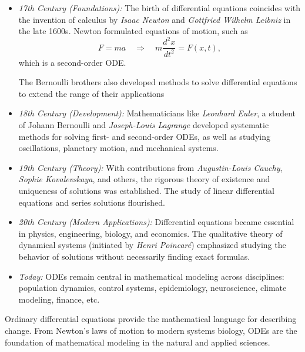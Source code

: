 \begin{itemize}
    \item \emph{17th Century (Foundations):}  
    The birth of differential equations coincides with the invention of calculus by \emph{Isaac Newton} and \emph{Gottfried Wilhelm Leibniz} in the late 1600s.  
    Newton formulated equations of motion, such as
    \[
    F = ma \quad \Rightarrow \quad m \frac{d^2x}{dt^2} = F(x,t),
    \]
    which is a second-order ODE.

    The Bernoulli brothers also developed methods to solve differential equations to extend the range of their applications

    \item \emph{18th Century (Development):}  
    Mathematicians like \emph{Leonhard Euler}, a student of Johann Bernoulli and \emph{Joseph-Louis Lagrange} developed systematic methods for solving first- and second-order ODEs, as well as studying oscillations, planetary motion, and mechanical systems.  

    \item \emph{19th Century (Theory):}  
    With contributions from \emph{Augustin-Louis Cauchy}, \emph{Sophie Kovalevskaya}, and others, the rigorous theory of existence and uniqueness of solutions was established. The study of linear differential equations and series solutions flourished.

    \item \emph{20th Century (Modern Applications):}  
    Differential equations became essential in physics, engineering, biology, and economics. The qualitative theory of dynamical systems (initiated by \emph{Henri Poincaré}) emphasized studying the behavior of solutions without necessarily finding exact formulas.

    \item \emph{Today:}  
    ODEs remain central in mathematical modeling across disciplines: population dynamics, control systems, epidemiology, neuroscience, climate modeling, finance, etc.
\end{itemize}

Ordinary differential equations provide the mathematical language for describing change.  
From Newton's laws of motion to modern systems biology, ODEs are the foundation of mathematical modeling in the natural and applied sciences.



